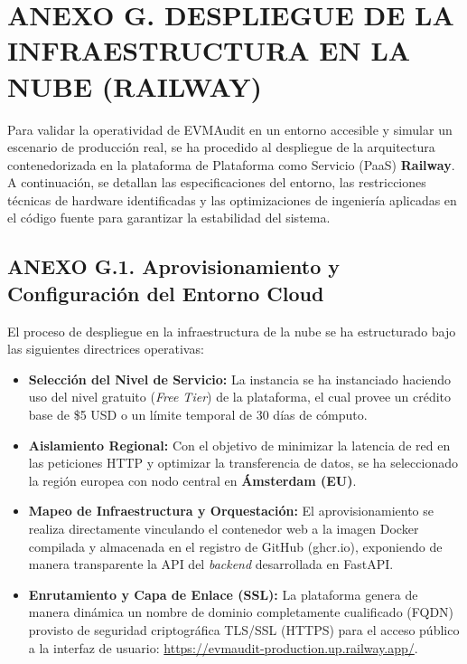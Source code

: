\section{ANEXO G. DESPLIEGUE DE LA INFRAESTRUCTURA EN LA NUBE
(RAILWAY)}\label{anexo-g.-despliegue-de-la-infraestructura-en-la-nube-railway}

Para validar la operatividad de EVMAudit en un entorno accesible y
simular un escenario de producción real, se ha procedido al despliegue
de la arquitectura contenedorizada en la plataforma de Plataforma como
Servicio (PaaS) \textbf{Railway}. A continuación, se detallan las
especificaciones del entorno, las restricciones técnicas de hardware
identificadas y las optimizaciones de ingeniería aplicadas en el código
fuente para garantizar la estabilidad del sistema.

\subsection{ANEXO G.1. Aprovisionamiento y Configuración del Entorno
Cloud}\label{anexo-g.1.-aprovisionamiento-y-configuraciuxf3n-del-entorno-cloud}

El proceso de despliegue en la infraestructura de la nube se ha
estructurado bajo las siguientes directrices operativas:

\begin{itemize}
\item
  \textbf{Selección del Nivel de Servicio:} La instancia se ha
  instanciado haciendo uso del nivel gratuito (\emph{Free Tier}) de la
  plataforma, el cual provee un crédito base de \$5 USD o un límite
  temporal de 30 días de cómputo.
\item
  \textbf{Aislamiento Regional:} Con el objetivo de minimizar la
  latencia de red en las peticiones HTTP y optimizar la transferencia de
  datos, se ha seleccionado la región europea con nodo central en
  \textbf{Ámsterdam (EU)}.
\item
  \textbf{Mapeo de Infraestructura y Orquestación:} El aprovisionamiento
  se realiza directamente vinculando el contenedor web a la imagen
  Docker compilada y almacenada en el registro de GitHub (ghcr.io),
  exponiendo de manera transparente la API del \emph{backend}
  desarrollada en FastAPI.
\item
  \textbf{Enrutamiento y Capa de Enlace (SSL):} La plataforma genera de
  manera dinámica un nombre de dominio completamente cualificado (FQDN)
  provisto de seguridad criptográfica TLS/SSL (HTTPS) para el acceso
  público a la interfaz de usuario:
  \url{https://evmaudit-production.up.railway.app/}.
\end{itemize}

